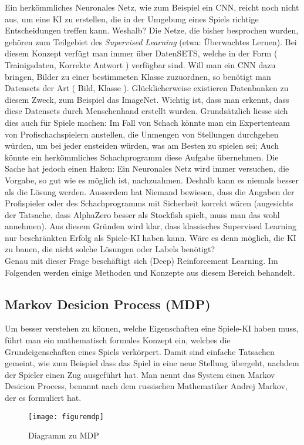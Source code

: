 \documentclass[12pt,a4paper]{article}
\begin{document}
Ein herkömmliches Neuronales Netz, wie zum Beispiel ein CNN, reicht noch nicht aus, um eine KI zu erstellen, die in der Umgebung eines Spiels richtige Entscheidungen treffen kann. Weshalb? Die Netze, die bisher besprochen wurden, gehören zum Teilgebiet des \textit{Supervised Learning} (etwa: Überwachtes Lernen). Bei diesem Konzept verfügt man immer über DatenSETS, welche in der Form ( Trainigsdaten, Korrekte Antwort ) verfügbar sind. Will man ein CNN dazu bringen, Bilder zu einer bestimmeten Klasse zuzuordnen, so benötigt man Datensets der Art ( Bild, Klasse ). Glücklicherweise existieren Datenbanken zu diesem Zweck, zum Beispiel das ImageNet\cite{imgnet}. Wichtig ist, dass man erkennt, dass diese Datensets durch Menschenhand erstellt wurden. Grundsätzlich liesse sich dies auch für Spiele machen: Im Fall von Schach könnte man ein Expertenteam von Profischachspielern anstellen, die Unmengen von Stellungen durchgehen würden, um bei jeder ensteiden würden, was am Besten zu spielen sei; Auch könnte ein herkömmliches Schachprogramm diese Aufgabe übernehmen. Die Sache hat jedoch einen Haken: Ein Neuronales Netz wird immer versuchen, die Vorgabe, so gut wie es möglich ist, nachzuahmen. Deshalb kann es niemals besser als die Lösung werden. Ausserdem hat Niemand bewiesen, dass die Angaben der Profispieler oder des Schachprogramms mit Sicherheit korrekt wären  (angesichts der Tatsache, dass AlphaZero besser als Stockfish spielt\cite{alphazero}, muss man das wohl annehmen). Aus diesem Gründen wird klar, dass klassisches Supervised Learning nur beschränkten Erfolg als Spiele-KI haben kann. Wäre es denn möglich, die KI zu bauen, die nicht solche Lösungen oder Labels benötigt?\\
Genau mit dieser Frage beschäftigt sich (Deep) Reinforcement Learning. Im Folgenden werden einige Methoden und Konzepte aus diesem Bereich behandelt.

\subsection{Markov Desicion Process (MDP)}

Um besser verstehen zu können, welche Eigenschaften eine Spiele-KI haben muss, führt man ein mathematisch formales Konzept ein, welches die Grundeigenschaften eines Spiels verkörpert. Damit sind einfache Tatsachen gemeint, wie zum Beispiel dass das Spiel in eine neue Stellung übergeht, nachdem der Spieler einen Zug ausgeführt hat. Man nennt das System einen Markov Desicion Process, benannt nach dem russischen Mathematiker Andrej Markov, der es formuliert hat\cite{mdpwiki}.
\begin{figure}[hbt]
\centering
\texttt{[image: figuremdp]}
\caption{Diagramm zu MDP\cite{figuremdp}}
\end{figure}
\end{document}
